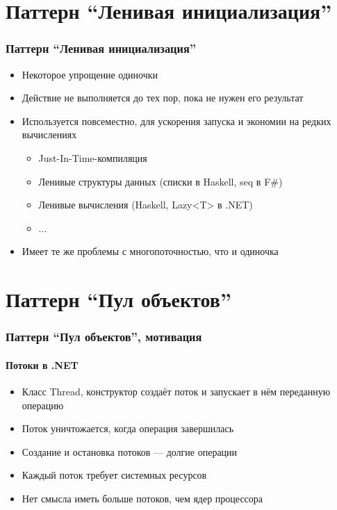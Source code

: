 \documentclass{../../slides-style}
\begin{document}
    \section{Паттерн ``Ленивая инициализация''}

    \begin{frame}
        \frametitle{Паттерн ``Ленивая инициализация''}
        \begin{itemize}
            \item Некоторое упрощение одиночки
            \item Действие не выполняется до тех пор, пока не нужен его результат
            \item Используется повсеместно, для ускорения запуска и экономии на редких вычислениях
            \begin{itemize}
                \item Just-In-Time-компиляция
                \item Ленивые структуры данных (списки в Haskell, seq в F\#)
                \item Ленивые вычисления (Haskell, Lazy<T> в .NET)
                \item ...
            \end{itemize}
            \item Имеет те же проблемы с многопоточностью, что и одиночка
        \end{itemize}
    \end{frame}

    \section{Паттерн ``Пул объектов''}

    \begin{frame}
        \frametitle{Паттерн ``Пул объектов'', мотивация}
        \framesubtitle{Потоки в .NET}
        \begin{itemize}
            \item Класс Thread, конструктор создаёт поток и запускает в нём переданную операцию
            \item Поток уничтожается, когда операция завершилась
            \item Создание и остановка потоков --- долгие операции
            \item Каждый поток требует системных ресурсов
            \item Нет смысла иметь больше потоков, чем ядер процессора
        \end{itemize}
    \end{frame}
\end{document}
